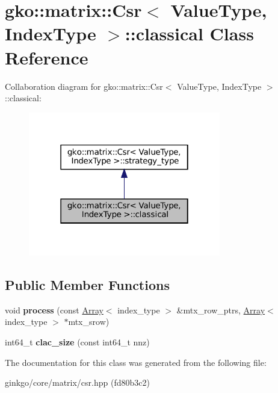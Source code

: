 \hypertarget{classgko_1_1matrix_1_1Csr_1_1classical}{}\section{gko\+:\+:matrix\+:\+:Csr$<$ Value\+Type, Index\+Type $>$\+:\+:classical Class Reference}
\label{classgko_1_1matrix_1_1Csr_1_1classical}


Collaboration diagram for gko\+:\+:matrix\+:\+:Csr$<$ Value\+Type, Index\+Type $>$\+:\+:classical\+:
\nopagebreak
\begin{figure}[H]
\begin{center}
\leavevmode
\includegraphics[width=238pt]{classgko_1_1matrix_1_1Csr_1_1classical__coll__graph}
\end{center}
\end{figure}
\subsection*{Public Member Functions}
\begin{DoxyCompactItemize}
\item 
\mbox{\label{classgko_1_1matrix_1_1Csr_1_1classical_a3d2766e56763c491948818e0f3da4356}} 
void {\bfseries process} (const \hyperlink{classgko_1_1Array}{Array}$<$ index\+\_\+type $>$ \&mtx\+\_\+row\+\_\+ptrs, \hyperlink{classgko_1_1Array}{Array}$<$ index\+\_\+type $>$ $\ast$mtx\+\_\+srow)
\item 
\mbox{\label{classgko_1_1matrix_1_1Csr_1_1classical_a790b475b079d3d97de776e968f459f41}} 
int64\+\_\+t {\bfseries clac\+\_\+size} (const int64\+\_\+t nnz)
\end{DoxyCompactItemize}


The documentation for this class was generated from the following file\+:\begin{DoxyCompactItemize}
\item 
ginkgo/core/matrix/csr.\+hpp (fd80b3c2)\end{DoxyCompactItemize}
